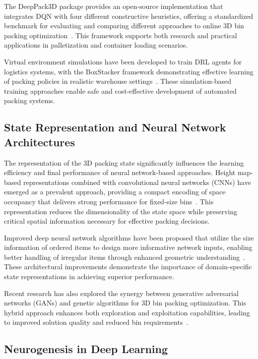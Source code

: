 \documentclass[12pt]{article}
\begin{document}
The DeepPack3D package provides an open-source implementation that integrates DQN with four different constructive heuristics, offering a standardized benchmark for evaluating and comparing different approaches to online 3D bin packing optimization~\cite{deeppack3d2025}. This framework supports both research and practical applications in palletization and container loading scenarios.

Virtual environment simulations have been developed to train DRL agents for logistics systems, with the BoxStacker framework demonstrating effective learning of packing policies in realistic warehouse settings~\cite{boxstacker2023}. These simulation-based training approaches enable safe and cost-effective development of automated packing systems.

\subsection{State Representation and Neural Network Architectures}

The representation of the 3D packing state significantly influences the learning efficiency and final performance of neural network-based approaches. Height map-based representations combined with convolutional neural networks (CNNs) have emerged as a prevalent approach, providing a compact encoding of space occupancy that delivers strong performance for fixed-size bins~\cite{cnn_heightmap2024}. This representation reduces the dimensionality of the state space while preserving critical spatial information necessary for effective packing decisions.

Improved deep neural network algorithms have been proposed that utilize the size information of ordered items to design more informative network inputs, enabling better handling of irregular items through enhanced geometric understanding~\cite{idnna2024}. These architectural improvements demonstrate the importance of domain-specific state representations in achieving superior performance.

Recent research has also explored the synergy between generative adversarial networks (GANs) and genetic algorithms for 3D bin packing optimization. This hybrid approach enhances both exploration and exploitation capabilities, leading to improved solution quality and reduced bin requirements~\cite{gan_ga_packing2024}.

\subsection{Neurogenesis in Deep Learning}
\end{document}
